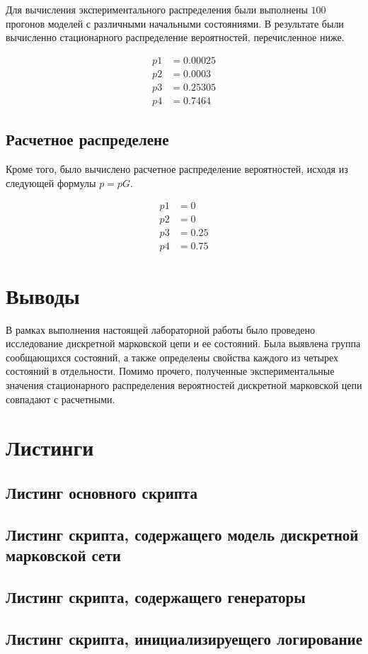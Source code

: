 Для вычисления экспериментального распределения были выполнены $100$ прогонов моделей с различными начальными состояниями.
В результате были вычисленно стационарного распределение вероятностей, перечисленное ниже.

\begin{align*}
    p1 & = 0.00025\\
    p2 & = 0.0003\\
    p3 & = 0.25305\\
    p4 & = 0.7464
\end{align*}

\subsection*{Расчетное распределене}

Кроме того, было вычислено расчетное распределение вероятностей, исходя из следующей формулы $p=pG$.

\begin{align*}
    p1 & = 0\\
    p2 & = 0\\
    p3 & = 0.25\\
    p4 & = 0.75
\end{align*}

\section*{Выводы}

В рамках выполнения настоящей лабораторной работы было проведено исследование дискретной марковской цепи и ее состояний.
Была выявлена группа сообщающихся состояний, а также определены свойства каждого из четырех состояний в отдельности.
Помимо прочего, полученные экспериментальные значения стационарного распределения вероятностей дискретной марковской цепи совпадают с
расчетными.

\section*{Листинги}

\subsection*{Листинг основного скрипта}


\subsection*{Листинг скрипта, содержащего модель дискретной марковской сети}


\subsection*{Листинг скрипта, содержащего генераторы}


\subsection*{Листинг скрипта, инициализируещего логирование}

